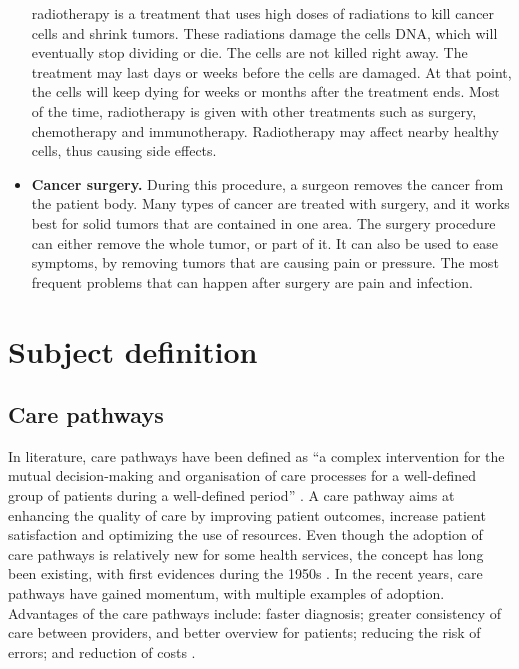 \begin{itemize}
          radiotherapy is a treatment that uses high doses of radiations to kill
          cancer cells and shrink tumors. These radiations damage the cells DNA,
          which will eventually stop dividing or die. The cells are not killed
          right away. The treatment may last days or weeks before the cells
          are damaged. At that point, the cells will keep dying for weeks or
          months after the treatment ends. Most of the time, radiotherapy
          is given with other treatments such as surgery, chemotherapy and
          immunotherapy. Radiotherapy may affect nearby healthy cells, thus
          causing side effects.
    \item \textbf{Cancer surgery.} During this procedure, a surgeon removes the
          cancer from the patient body. Many types of cancer are treated with
          surgery, and it works best for solid tumors that are contained in one
          area. The surgery procedure can either remove the whole tumor, or
          part of it. It can also be used to ease symptoms, by removing
          tumors that are causing pain or pressure. The most frequent problems
          that can happen after surgery are pain and infection.

\end{itemize}

\section{Subject definition}

\subsection{Care pathways}

In literature, care pathways have been defined as ``a complex intervention for
the mutual decision-making and organisation of care processes for a well-defined
group of patients during a well-defined period'' \cite{vanhaecht_impact_2007}. A
care pathway aims at enhancing the quality of care by improving patient
outcomes, increase patient satisfaction and optimizing the use of resources.
Even though the adoption of care pathways is relatively new for some health
services, the concept has long been existing, with first evidences during the
1950s \cite{schrijvers_care_2012}. In the recent years, care pathways have
gained momentum, with multiple examples of adoption. Advantages of the care
pathways include: faster diagnosis; greater consistency of care between
providers, and better overview for patients; reducing the risk of errors;
and reduction of costs \cite{schrijvers_care_2012}.

